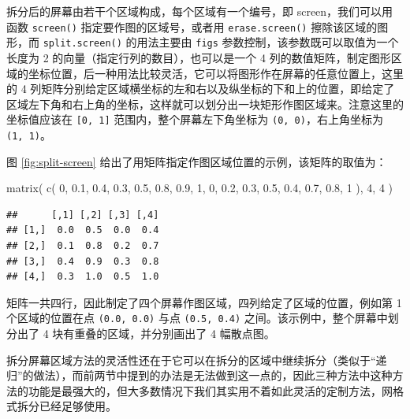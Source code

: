 \documentclass[
  b5paper,
  UTF8,twoside]{book}
\newenvironment{Shaded}{\begin{snugshade}}{\end{snugshade}}
\newcommand{\DecValTok}[1]{\textcolor[rgb]{0.00,0.00,0.81}{#1}}
\newcommand{\FloatTok}[1]{\textcolor[rgb]{0.00,0.00,0.81}{#1}}
\newcommand{\FunctionTok}[1]{\textcolor[rgb]{0.00,0.00,0.00}{#1}}
\newcommand{\NormalTok}[1]{#1}
\begin{document}
拆分后的屏幕由若干个区域构成，每个区域有一个编号，即 screen，我们可以用函数 \texttt{screen()} 指定要作图的区域号，或者用 \texttt{erase.screen()} 擦除该区域的图形，而 \texttt{split.screen()} 的用法主要由 \texttt{figs} 参数控制，该参数既可以取值为一个长度为 2 的向量（指定行列的数目），也可以是一个 4 列的数值矩阵，制定图形区域的坐标位置，后一种用法比较灵活，它可以将图形作在屏幕的任意位置上，这里的 4 列矩阵分别给定区域横坐标的左和右以及纵坐标的下和上的位置，即给定了区域左下角和右上角的坐标，这样就可以划分出一块矩形作图区域来。注意这里的坐标值应该在 \texttt{{[}0,\ 1{]}} 范围内，整个屏幕左下角坐标为 \texttt{(0,\ 0)}，右上角坐标为 \texttt{(1,\ 1)}。

图 \ref{fig:split-screen} 给出了用矩阵指定作图区域位置的示例，该矩阵的取值为：

\begin{Shaded}
\begin{Highlighting}[]
\FunctionTok{matrix}\NormalTok{(}
  \FunctionTok{c}\NormalTok{(}
    \DecValTok{0}\NormalTok{, }\FloatTok{0.1}\NormalTok{, }\FloatTok{0.4}\NormalTok{, }\FloatTok{0.3}\NormalTok{,}
    \FloatTok{0.5}\NormalTok{, }\FloatTok{0.8}\NormalTok{, }\FloatTok{0.9}\NormalTok{, }\DecValTok{1}\NormalTok{,}
    \DecValTok{0}\NormalTok{, }\FloatTok{0.2}\NormalTok{, }\FloatTok{0.3}\NormalTok{, }\FloatTok{0.5}\NormalTok{,}
    \FloatTok{0.4}\NormalTok{, }\FloatTok{0.7}\NormalTok{, }\FloatTok{0.8}\NormalTok{, }\DecValTok{1}
\NormalTok{  ),}
  \DecValTok{4}\NormalTok{, }\DecValTok{4}
\NormalTok{)}
\end{Highlighting}
\end{Shaded}

\begin{verbatim}
##      [,1] [,2] [,3] [,4]
## [1,]  0.0  0.5  0.0  0.4
## [2,]  0.1  0.8  0.2  0.7
## [3,]  0.4  0.9  0.3  0.8
## [4,]  0.3  1.0  0.5  1.0
\end{verbatim}

矩阵一共四行，因此制定了四个屏幕作图区域，四列给定了区域的位置，例如第 1 个区域的位置在点 \texttt{(0.0,\ 0.0)} 与点 \texttt{(0.5,\ 0.4)} 之间。该示例中，整个屏幕中划分出了 4 块有重叠的区域，并分别画出了 4 幅散点图。

拆分屏幕区域方法的灵活性还在于它可以在拆分的区域中继续拆分（类似于``递归''的做法），而前两节中提到的办法是无法做到这一点的，因此三种方法中这种方法的功能是最强大的，但大多数情况下我们其实用不着如此灵活的定制方法，网格式拆分已经足够使用。
\end{document}
